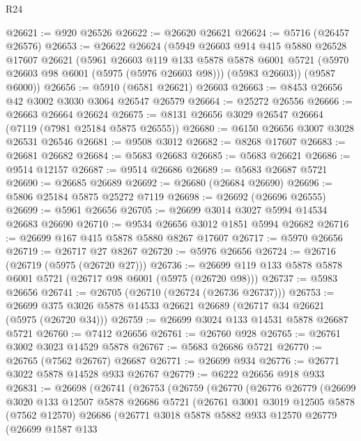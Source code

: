 \begin{lexlean}{R24}
\begin{coremodule}
@26621 := @920 @26526
@26622 := @26620 @26621
@26624 := @5716 (@26457 @26576)
@26653 := @26622
    @26624
    (@5949
      @26603
      @914
      @415
      @5880
      @26528
      @17607
      @26621
      (@5961
        @26603
        @119
        @133
        @5878
        @5878
        @6001
        @5721
        (@5970 @26603 @98 @6001 (@5975 (@5976 @26603 @98)))
        (@5983 @26603))
      (@9587 @6000))
@26656 := @5910 (@6581 @26621) @26603
@26663 := @8453 @26656 @42 @3002 @3030 @3064 @26547 @26579
@26664 := @25272 @26556
@26666 := @26663 @26664 @26624
@26675 := @8131 @26656 @3029 @26547 @26664 (@7119 (@7981 @25184 @5875 @26555))
@26680 := @6150 @26656 @3007 @3028 @26531 @26546
@26681 := @9508 @3012
@26682 := @8268 @17607
@26683 := @26681 @26682
@26684 := @5683 @26683
@26685 := @5683 @26621
@26686 := @9514 @12157
@26687 := @9514 @26686
@26689 := @5683 @26687 @5721
@26690 := @26685 @26689
@26692 := @26680 (@26684 @26690)
@26696 := @5806 @25184 @5875 @25272 @7119
@26698 := @26692 (@26696 @26555)
@26699 := @5961 @26656
@26705 := @26699 @3014 @3027 @5994 @14534 @26683 @26690
@26710 := @9534 @26656 @3012 @1851 @5994 @26682
@26716 := @26699 @167 @415 @5878 @5880 @8267 @17607
@26717 := @5970 @26656
@26719 := @26717 @27 @8267
@26720 := @5976 @26656
@26724 := @26716 (@26719 (@5975 (@26720 @27)))
@26736 := @26699 @119 @133 @5878 @5878 @6001 @5721 (@26717 @98 @6001 (@5975 (@26720 @98)))
@26737 := @5983 @26656
@26741 := @26705 (@26710 (@26724 (@26736 @26737)))
@26753 := @26699 @375 @3026 @5878 @14533 @26621 @26689 (@26717 @34 @26621 (@5975 (@26720 @34)))
@26759 := @26699 @3024 @133 @14531 @5878 @26687 @5721
@26760 := @7412 @26656
@26761 := @26760 @928
@26765 := @26761 @3002 @3023 @14529 @5878
@26767 := @5683 @26686 @5721
@26770 := @26765 (@7562 @26767) @26687
@26771 := @26699 @934
@26776 := @26771 @3022 @5878 @14528 @933 @26767
@26779 := @6222 @26656 @918 @933
@26831 := @26698
    (@26741
      (@26753
        (@26759
          (@26770
            (@26776
              @26779
              (@26699
                @3020
                @133
                @12507
                @5878
                @26686
                @5721
                (@26761
                  @3001
                  @3019
                  @12505
                  @5878
                  (@7562 @12570)
                  @26686
                  (@26771
                    @3018
                    @5878
                    @5882
                    @933
                    @12570
                    @26779
                    (@26699
                      @1587
                      @133

\end{coremodule}
\end{lexlean}
